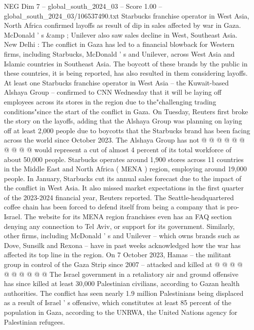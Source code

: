 \begin{textsample}{NEG Dim 7 – global\_south\_2024\_03 – Score 1.00 – global\_south\_2024\_03/106537490.txt}  \label{ex:f7_neg_299}
Starbucks franchise operator in West Asia, North Africa confirmed layoffs as result of dip in sales affected by war in Gaza.
McDonald ' s \&amp ; Unilever also saw sales decline in West, Southeast Asia.
New Delhi : The conflict in Gaza has led to a financial blowback for Western firms, including Starbucks, McDonald ' s and Unilever, across West Asia and Islamic countries in Southeast Asia.
The boycott of these brands by the public in these countries, it is being reported, has also resulted in them considering layoffs.
At least one Starbucks franchise operator in West Asia -- the Kuwait-based Alshaya Group -- confirmed to CNN Wednesday that it will be laying off employees across its stores in the region due to the"challenging trading conditions"since the start of the conflict in Gaza.
On Tuesday, Reuters first broke the story on the layoffs, adding that the Alshaya Group was planning on laying off at least 2,000 people due to boycotts that the Starbucks brand has been facing across the world since October 2023.
The Alshaya Group has not @ @ @ @ @ @ @ @ @ @ would represent a cut of almost 4 percent of its total workforce of about 50,000 people.
Starbucks operates around 1,900 stores across 11 countries in the Middle East and North Africa ( MENA ) region, employing around 19,000 people.
In January, Starbucks cut its annual sales forecast due to the impact of the conflict in West Asia.
It also missed market expectations in the first quarter of the 2023-2024 financial year, Reuters reported.
The Seattle-headquartered coffee chain has been forced to defend itself from being a company that is pro-Israel.
The website for its MENA region franchises even has an FAQ section denying any connection to Tel Aviv, or support for its government.
Similarly, other firms, including McDonald ' s and Unilever -- which owns brands such as Dove, Sunsilk and Rexona -- have in past weeks acknowledged how the war has affected its top line in the region.
On 7 October 2023, Hamas -- the militant group in control of the Gaza Strip since 2007 -- attacked and killed at @ @ @ @ @ @ @ @ @ @ The Israel government in a retaliatory air and ground offensive has since killed at least 30,000 Palestinian civilians, according to Gazan health authorities.
The conflict has seen nearly 1.9 million Palestinians being displaced as a result of Israel ' s offensive, which constitutes at least 85 percent of the population in Gaza, according to the UNRWA, the United Nations agency for Palestinian refugees.

\end{textsample}
